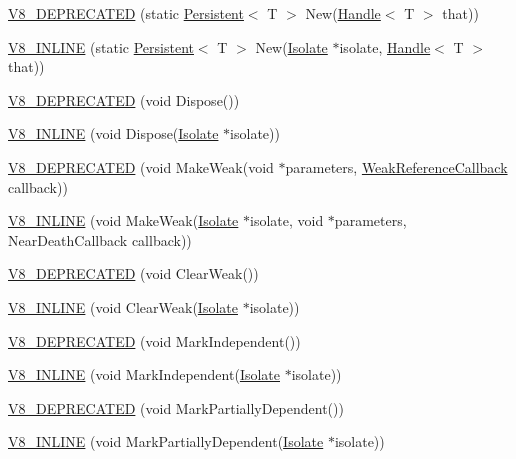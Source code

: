 \begin{DoxyCompactItemize}
\item 
\hyperlink{classv8_1_1_persistent_ae4eaf2280b5caab67c009840f2db26c3}{V8\+\_\+\+D\+E\+P\+R\+E\+C\+A\+T\+E\+D} (static \hyperlink{classv8_1_1_persistent}{Persistent}$<$ T $>$ New(\hyperlink{classv8_1_1_handle}{Handle}$<$ T $>$ that))
\item 
\hyperlink{classv8_1_1_persistent_ad38190b1fcec742b889e3850e41525dc}{V8\+\_\+\+I\+N\+L\+I\+N\+E} (static \hyperlink{classv8_1_1_persistent}{Persistent}$<$ T $>$ New(\hyperlink{classv8_1_1_isolate}{Isolate} $\ast$isolate, \hyperlink{classv8_1_1_handle}{Handle}$<$ T $>$ that))
\item 
\hyperlink{classv8_1_1_persistent_a548f03b64fc9f666282ee4f76024f1ff}{V8\+\_\+\+D\+E\+P\+R\+E\+C\+A\+T\+E\+D} (void Dispose())
\item 
\hyperlink{classv8_1_1_persistent_aa0f3928a4dd02a35d174299346673846}{V8\+\_\+\+I\+N\+L\+I\+N\+E} (void Dispose(\hyperlink{classv8_1_1_isolate}{Isolate} $\ast$isolate))
\item 
\hyperlink{classv8_1_1_persistent_a78495fe8478ee079189853d7905d879b}{V8\+\_\+\+D\+E\+P\+R\+E\+C\+A\+T\+E\+D} (void Make\+Weak(void $\ast$parameters, \hyperlink{namespacev8_a4d5db775dbc002b23f1b55ec7ce80ea5}{Weak\+Reference\+Callback} callback))
\item 
\hyperlink{classv8_1_1_persistent_a631a69324036a9863739c73579c91da2}{V8\+\_\+\+I\+N\+L\+I\+N\+E} (void Make\+Weak(\hyperlink{classv8_1_1_isolate}{Isolate} $\ast$isolate, void $\ast$parameters, Near\+Death\+Callback callback))
\item 
\hyperlink{classv8_1_1_persistent_a09d4a3644f139e5865d0b95b3103648a}{V8\+\_\+\+D\+E\+P\+R\+E\+C\+A\+T\+E\+D} (void Clear\+Weak())
\item 
\hyperlink{classv8_1_1_persistent_a500449e9aaa394cd9df95c698a487ac9}{V8\+\_\+\+I\+N\+L\+I\+N\+E} (void Clear\+Weak(\hyperlink{classv8_1_1_isolate}{Isolate} $\ast$isolate))
\item 
\hyperlink{classv8_1_1_persistent_a343667c790896c99cfbb6a28c80b6513}{V8\+\_\+\+D\+E\+P\+R\+E\+C\+A\+T\+E\+D} (void Mark\+Independent())
\item 
\hyperlink{classv8_1_1_persistent_a2b4071c032c97886ba1bcb0ebacb2209}{V8\+\_\+\+I\+N\+L\+I\+N\+E} (void Mark\+Independent(\hyperlink{classv8_1_1_isolate}{Isolate} $\ast$isolate))
\item 
\hyperlink{classv8_1_1_persistent_afeadb5d8e81e1d4cc2c18b76a10a63d1}{V8\+\_\+\+D\+E\+P\+R\+E\+C\+A\+T\+E\+D} (void Mark\+Partially\+Dependent())
\item 
\hyperlink{classv8_1_1_persistent_a89a708d5a98331a2683324be9dc5a474}{V8\+\_\+\+I\+N\+L\+I\+N\+E} (void Mark\+Partially\+Dependent(\hyperlink{classv8_1_1_isolate}{Isolate} $\ast$isolate))

\end{DoxyCompactItemize}
